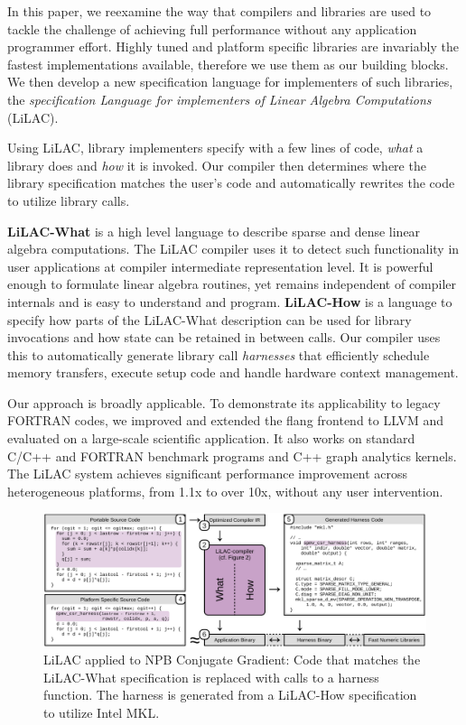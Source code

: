 In this paper, we reexamine the way that compilers and libraries are used
to tackle the challenge of achieving full performance without any application
programmer effort.
Highly tuned and platform specific libraries are invariably the fastest
implementations available, therefore we use them as our building blocks.
We then develop a new specification language for implementers of such
libraries, the {\em specification Language for implementers of Linear Algebra
Computations} (LiLAC).

Using LiLAC, library implementers specify with a few lines of code,
{\em what} a library does and {\em how} it is invoked.  Our compiler
then determines where the library specification matches the user's
code and automatically rewrites the code to utilize library calls.

\noindent
{\bf LiLAC-What} is a high level language to describe sparse and dense linear
algebra computations.
The LiLAC compiler uses it to detect such functionality
in user applications at compiler intermediate representation level.
It is powerful enough to formulate linear algebra routines, yet remains
independent of compiler internals and is easy to understand and program.
\linebreak
\noindent
{\bf LiLAC-How} is a language to specify how parts of the LiLAC-What description
can be used for library invocations and how state can be retained in between
calls.
Our compiler uses this to automatically generate library call {\em harnesses} that
efficiently schedule memory transfers, execute setup code and handle hardware
context management.

Our approach is broadly applicable. To demonstrate its applicability
to legacy FORTRAN codes, we improved and extended the flang frontend
to LLVM and evaluated on a large-scale scientific application.
It also works on standard C/C++ and FORTRAN benchmark programs and C++ graph
\mbox{analytics} kernels. The LiLAC system achieves significant performance
improvement across heterogeneous platforms, from 1.1x to over 10x, without any
user intervention.
\begin{figure}[t]
\includegraphics[width=\textwidth]{figures/lilac_overview.pdf}
\caption{LiLAC applied to NPB Conjugate Gradient:
         Code that matches the LiLAC-What specification is replaced with calls
         to a harness function. The harness is generated from a LiLAC-How
         specification to utilize Intel MKL.}
\label{motivationcode}
\end{figure}


